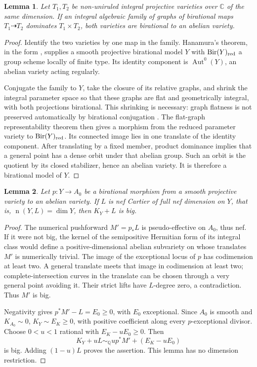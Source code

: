 \documentclass[12pt,a4paper,psamsfonts]{amsart}
\theoremstyle{definition}
\theoremstyle{plain}
\newtheorem{lemma}{Lemma}[section]
\newcommand{\Q}{\mathbb Q}
\newcommand{\C}{\mathbb C}
\newcommand{\nef}{\operatorname{n}}
\begin{document}
\begin{lemma}\label{lem:fixed-graphs}
Let $T_1,T_2$ be non-uniruled integral projective varieties
over $\C$ of the same dimension. If an integral algebraic family
of graphs of birational maps $T_1\dashrightarrow T_2$ dominates
$T_1\times T_2$, both varieties are birational to an abelian variety.
\end{lemma}
\begin{proof}
Identify the two varieties by one map in the family.
Hanamura's theorem, in the form
\cite[Theorem~3.8]{Blanc}, supplies a smooth projective birational
model $Y$ with $\operatorname{Bir}(Y)_{\rm red}$ a group scheme
locally of finite type. Its identity component is
$\operatorname{Aut}^0(Y)$, an abelian variety acting regularly.

Conjugate the family to $Y$, take the closure of its relative
graphs, and shrink the integral parameter space so that these
graphs are flat and geometrically integral, with both projections
birational. This shrinking is necessary: graph flatness is not
preserved automatically by birational conjugation
\cite[Remark~3.6]{Blanc}. The flat-graph representability theorem
\cite[Proposition~3.7]{Blanc} then gives a morphism from the
reduced parameter variety to $\operatorname{Bir}(Y)_{\rm red}$.
Its connected image lies in one translate of the identity component.
After translating by a fixed member, product dominance implies
that a general point has a dense orbit under that abelian group.
Such an orbit is the quotient by its closed stabilizer, hence an
abelian variety. It is therefore a birational model of $Y$.
\end{proof}

\begin{lemma}\label{lem:abelian-adjoint}
Let $p:Y\to A_0$ be a birational morphism from a smooth projective
variety to an abelian variety. If $L$ is nef Cartier of full nef
dimension on $Y$, that is, $\nef(Y,L)=\dim Y$, then $K_Y+L$ is big.
\end{lemma}
\begin{proof}
The numerical pushforward $M'=p_*L$ is pseudo-effective on $A_0$,
thus nef. If it were not big, the kernel of the semipositive
Hermitian form of its integral class would define a
positive-dimensional abelian subvariety on whose translates $M'$
is numerically trivial. The image of the exceptional locus of $p$
has codimension at least two. A general translate meets that image
in codimension at least two; complete-intersection curves in the
translate can be chosen through a very general point avoiding it.
Their strict lifts have $L$-degree zero, a contradiction. Thus $M'$
is big.

Negativity gives $p^*M'-L=E_0\ge0$, with $E_0$ exceptional.
Since $A_0$ is smooth and $K_{A_0}\sim0$, $K_Y\sim E_K\ge0$,
with positive coefficient along every $p$-exceptional divisor.
Choose $0<u<1$ rational with $E_K-uE_0\ge0$. Then
\[
 K_Y+uL\sim_\Q up^*M'+(E_K-uE_0)
\]
is big. Adding $(1-u)L$ proves the assertion. This lemma has no
dimension restriction.
\end{proof}
\end{document}
